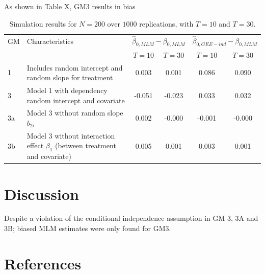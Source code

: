 \documentclass[
  12pt,
  a4paper,
]{article}
\begin{document}
As shown in Table X, GM3 results in bias

\begin{table}[H]
    \caption{Simulation results for $N=200$ over $1000$ replications, with $T=10$ and $T=30$.}
    \centering
    \begin{tabular}{@{}p{1.5cm} p{5cm} cc cc@{}}
        \toprule
        GM & Characteristics & \multicolumn{2}{c}{$\hat{\beta}_{0,MLM}-\beta_{0,MLM}$} & \multicolumn{2}{c}{$\hat{\beta}_{0,GEE-ind}-\beta_{0,MLM}$} \\ 
        \cmidrule(lr){3-4} \cmidrule(lr){5-6}
           &                 & \( T = 10 \) & \( T = 30 \) & \( T = 10 \) & \( T = 30 \) \\ \midrule
        1  & Includes random intercept and random slope for treatment & 0.003 & 0.001 & 0.086 & 0.090 \\
        3  & Model 1 with dependency random intercept and covariate       & -0.051 & -0.023 & 0.033 & 0.032 \\
        3a & Model 3 without random slope $b_{2i}$           & 0.002 & -0.000 & -0.001 & -0.000 \\
        3b & Model 3 without interaction effect $\beta_1$ (between treatment and covariate) & 0.005 & 0.001 & 0.003 & 0.001 \\
        \bottomrule
    \end{tabular}
\end{table}

\section{Discussion}\label{discussion}

Despite a violation of the conditional independence assumption in GM 3,
3A and 3B; biased MLM estimates were only found for GM3.

\newpage

\section{References}\label{references}
\end{document}
